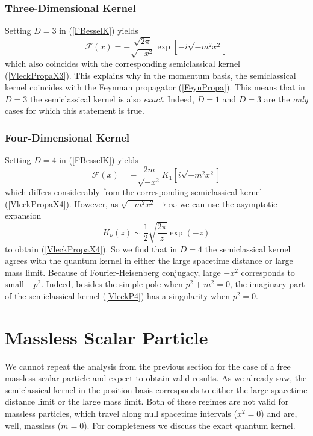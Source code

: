\subsubsection{Three-Dimensional Kernel}
Setting $D = 3$ in (\ref{FBesselK}) yields
\begin{equation}
	\mathcal{F}(x) = - \frac{\sqrt{2 \pi}}{\sqrt{-x^{2}}} \exp{\left[ - i \sqrt{- m^{2} x^{2}} \right]}
\end{equation}
which also coincides with the corresponding semiclassical kernel (\ref{VleckPropaX3}). This explains why in the momentum basis, the semiclassical kernel coincides with the Feynman propagator (\ref{FeynPropa}). This means that in $D = 3$ the semiclassical kernel is also \textit{exact}. Indeed, $D = 1$ and $D = 3$ are the \textit{only} cases for which this statement is true.
\subsubsection{Four-Dimensional Kernel}
Setting $D = 4$ in (\ref{FBesselK}) yields
\begin{equation}
	\mathcal{F}(x) = - \frac{2 m}{\sqrt{-x^{2}}} K_{1}\left[ i \sqrt{- m^{2} x^{2}} \right]
\end{equation}
which differs considerably from the corresponding semiclassical kernel (\ref{VleckPropaX4}). However, as $\sqrt{-m^{2} x^{2}} \rightarrow \infty$ we can use the asymptotic expansion
\begin{equation}
	K_{\nu}(z) \sim \frac{1}{2} \sqrt{\frac{2\pi}{z}} \exp{(-z)}
\end{equation}
to obtain (\ref{VleckPropaX4}). So we find that in $D = 4$ the semiclassical kernel agrees with the quantum kernel in either the large spacetime distance or large mass limit. Because of Fourier-Heisenberg conjugacy, large $-x^{2}$ corresponds to small $-p^{2}$. Indeed, besides the simple pole when $p^{2} + m^{2} = 0$, the imaginary part of the semiclassical kernel (\ref{VleckP4}) has a singularity when $p^{2} = 0$.
\section{Massless Scalar Particle}
We cannot repeat the analysis from the previous section for the case of a free massless scalar particle and expect to obtain valid results. As we already saw, the semiclassical kernel in the position basis corresponds to either the large spacetime distance limit or the large mass limit. Both of these regimes are not valid for massless particles, which travel along null spacetime intervals ($x^{2} = 0$) and are, well, massless ($m = 0$). For completeness we discuss the exact quantum kernel.

